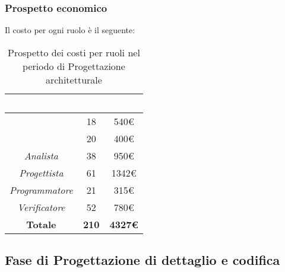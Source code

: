 \subsubsection{Prospetto economico}
Il costo per ogni ruolo è il seguente:
\begin{table}[H]
	\begin{center}
		\begin{tabular}{ |c c c| }
		\rowcolor{darkblue} 
		\textcolor{white}{\textbf{Ruolo}} & \textcolor{white}{\textbf{Ore}} & \textcolor{white}{\textbf{Costo}} \\ \hline
		\textit{\Responsabile} 	& 18 & 540€ \\ \hline
		\textit{\Amministratore} 	& 20 & 400€ \\ \hline
		\textit{Analista} 		& 38 & 950€ \\ \hline
		\textit{Progettista} 	& 61 & 1342€\\ \hline
		\textit{Programmatore}  	& 21 & 315€ \\ \hline
		\textit{Verificatore} 	& 52 & 780€ \\ \hline
		\textbf{Totale} & \textbf{210} & \textbf{4327€} \\ \hline
		\end{tabular}
	\caption{ Prospetto dei costi per ruoli nel periodo di Progettazione architetturale}
	\end{center}
\end{table}

\subsection{Fase di Progettazione di dettaglio e codifica}
